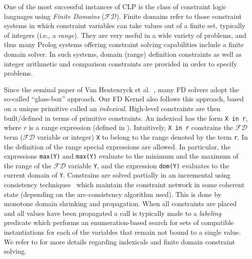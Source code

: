 \documentclass{llncs}
\renewcommand\cref[1]{\Cref{#1}}
\newcommand{\fd}{$\mathcal{FD}$\xspace}
\begin{document}
One of the most successful instances of CLP is the class of constraint
logic languages using \emph{Finite Domains} (\fd).
Finite domains refer to those constraint systems in which constraint
variables can take values out of a finite set, typically of integers
(i.e., a {\em range}). They are very useful in a wide variety of problems, and thus many
Prolog systems offering constraint solving capabilities include a
finite domain solver.
In such systems, domain (range) definition
constraints as well as integer arithmetic and comparison constraints are
provided in order to specify problems.

Since the seminal paper of Van Hentenryck et al.~\cite{ccfd-jlp}, many
FD solvers adopt the so-called ``glass-box'' approach. Our FD Kernel also 
follows this approach, based on a unique primitive called an
\emph{indexical}. High-level constraints are then built/defined in terms of
primitive constraints.
An indexical has the form
\verb|X in r|, where $r$ is a range expression (defined in
\cref{fig:range:syntax}).  Intuitively, \verb|X in r| constrains the
\fd term (\fd variable or integer) \verb|X| to belong to the range
denoted by the term \verb|r|. In the definition of the range special
expressions are allowed. In particular, the expressions \verb|max(Y)|
and \verb|max(Y)| evaluate to the minimum and the maximum of the range
of the \fd variable \verb|Y|, and the expression \verb|dom(Y)|
evaluates to the current domain of \verb|Y|.
Constrains are solved partially in an incremental using consistency
techniques~\cite{Dib10arc_consistency_survey} which maintain the constraint network in
some coherent state (depending on the arc-consistency algorithm
used). This is done by monotone domain shrinking and propagation. When
all constraints are placed and all values have been propagated a call
is typically made to a \emph{labeling} predicate which performs an
enumeration-based search for sets of compatible instantiations for
each of the variables that remain not bound to a single value. We
refer to \cite{ccfd-jlp} for more details regarding indexicals and
finite domain constraint solving.
\end{document}
